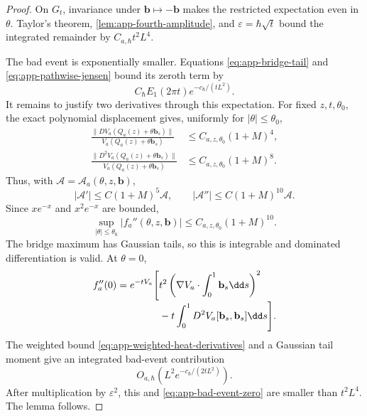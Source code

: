 \begin{proof}
On \(G_t\), invariance under \(\mathbf b\mapsto-\mathbf b\) makes the
restricted expectation even in \(\theta\).  Taylor's theorem,
\cref{lem:app-fourth-amplitude}, and \(\varepsilon=\hbar\sqrt t\) bound the
integrated remainder by \(C_{a,\hbar}t^2L^4\).

The bad event is exponentially smaller.  Equations
\eqref{eq:app-bridge-tail} and \eqref{eq:app-pathwise-jensen} bound its zeroth
term by
\begin{equation}
 C_{\hbar}E_1(2\pi t)e^{-c_{\hbar}/(tL^2)}.
 \label{eq:app-bad-event-zero}
\end{equation}
It remains to justify two derivatives through this expectation.  For fixed
\(z,t,\theta_0\), the exact polynomial displacement gives, uniformly for
\(|\theta|\le\theta_0\),
\begin{align}
 \frac{\|DV_a(Q_a(z)+\theta\mathbf b_s)\|}
 {V_a(Q_a(z)+\theta\mathbf b_s)}
 &\le C_{a,z,\theta_0}(1+M)^4,\\
 \frac{\|D^2V_a(Q_a(z)+\theta\mathbf b_s)\|}
 {V_a(Q_a(z)+\theta\mathbf b_s)}
 &\le C_{a,z,\theta_0}(1+M)^8.
\end{align}
Thus, with \(\mathcal A=\mathcal A_a(\theta,z,\mathbf b)\),
\begin{equation}
 |\mathcal A'|\le C(1+M)^5\mathcal A,
 \qquad
 |\mathcal A''|\le C(1+M)^{10}\mathcal A.
\end{equation}
Since \(xe^{-x}\) and \(x^2e^{-x}\) are bounded,
\begin{equation}
 \sup_{|\theta|\le\theta_0}|f_a''(\theta,z,\mathbf b)|
 \le C_{a,z,\theta_0}(1+M)^{10}.
 \label{eq:app-bad-event-dominator}
\end{equation}
The bridge maximum has Gaussian tails, so this is integrable and dominated
differentiation is valid.  At \(\theta=0\),
\begin{align}
 f_a''(0)=e^{-tV_a}\Bigg[&t^2
 \left(\nabla V_a\cdot\int_0^1\mathbf b_s\dd s\right)^2
 \notag\\[-1mm]
 &-t\int_0^1D^2V_a[\mathbf b_s,\mathbf b_s]\dd s\Bigg].
\end{align}
The weighted bound \eqref{eq:app-weighted-heat-derivatives} and a Gaussian
tail moment give an integrated bad-event contribution
\begin{equation}
 O_{a,\hbar}\!\left(L^2e^{-c_{\hbar}/(2tL^2)}\right).
\end{equation}
After multiplication by \(\varepsilon^2\), this and
\cref{eq:app-bad-event-zero} are smaller than \(t^2L^4\).  The lemma follows.
\end{proof}

